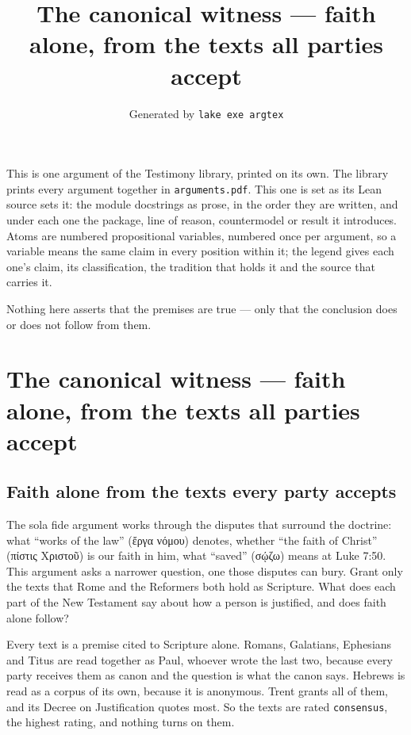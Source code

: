 \documentclass[11pt,paper=\testimonypaper,DIV=13,parskip=false]{scrartcl}
\title{The canonical witness — faith alone, from the texts all parties accept}
\author{\credit{TestimonyArguments.CanonicalWitness}}
\date{Generated by \texttt{lake exe argtex}}
\begin{document}
\maketitle
\noindent This is one argument of the Testimony library, printed on its own. The library prints every argument together in \texttt{arguments.pdf}. This one is set as its Lean source sets it: the module docstrings as prose, in the order they are written, and under each one the package, line of reason, countermodel or result it introduces. Atoms are numbered propositional variables, numbered once per argument, so a variable means the same claim in every position within it; the legend gives each one's claim, its classification, the tradition that holds it and the source that carries it.

\noindent Nothing here asserts that the premises are true --- only that the conclusion does or does not follow from them.

\tableofcontents
\clearpage
\section*{The canonical witness — faith alone, from the texts all parties accept}

\subsection*{Faith alone from the texts every party accepts}
The sola fide argument works through the disputes that surround the doctrine: what “works of the law” (ἔργα νόμου) denotes, whether “the faith of Christ” (πίστις Χριστοῦ) is our faith in him, what “saved” (σῴζω) means at Luke 7:50. This argument asks a narrower question, one those disputes can bury. Grant only the texts that Rome and the Reformers both hold as Scripture. What does each part of the New Testament say about how a person is justified, and does faith alone follow?

Every text is a premise cited to Scripture alone. Romans, Galatians, Ephesians and Titus are read together as Paul, whoever wrote the last two, because every party receives them as canon and the question is what the canon says. Hebrews is read as a corpus of its own, because it is anonymous. Trent grants all of them, and its Decree on Justification quotes most. So the texts are rated \texttt{consensus}, the highest rating, and nothing turns on them.
\end{document}
